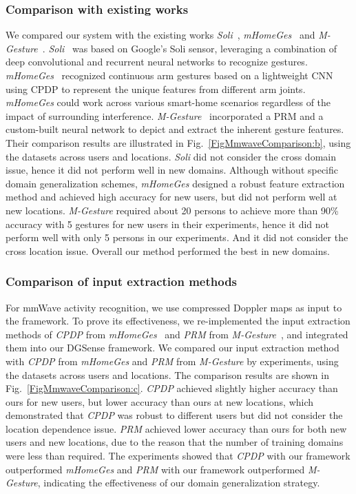 \documentclass[journal]{IEEEtran}
\begin{document}
\subsubsection{Comparison with existing works}
We compared our system with the existing works \textit{Soli}~\cite{Soli:2016}, \textit{mHomeGes}~\cite{LiuH:2020} and \textit{M-Gesture}~\cite{LiuH:2022}. \textit{Soli}~\cite{Soli:2016} was based on Google’s Soli sensor, leveraging a combination of deep convolutional and recurrent neural networks to recognize gestures. \textit{mHomeGes}~\cite{LiuH:2020} recognized continuous arm gestures based on a lightweight CNN using CPDP to represent the unique features from different arm joints. \textit{mHomeGes} could work across various smart-home scenarios regardless of the impact of surrounding interference. \textit{M-Gesture}~\cite{LiuH:2022} incorporated a PRM and a custom-built neural network to depict and extract the inherent gesture features. Their comparison results are illustrated in Fig.~\ref{FigMmwaveComparison:b}, using the datasets across users and locations. \textit{Soli} did not consider the cross domain issue, hence it did not perform well in new domains. Although without specific domain generalization schemes, \textit{mHomeGes} designed a robust feature extraction method and achieved high accuracy for new users, but did not perform well at new locations. \textit{M-Gesture} required about 20 persons to achieve more than 90\% accuracy with 5 gestures for new users in their experiments, hence it did not perform well with only 5 persons in our experiments. And it did not consider the cross location issue. Overall our method performed the best in new domains.

\subsubsection{Comparison of input extraction methods}
For mmWave activity recognition, we use compressed Doppler maps as input to the framework. To prove its effectiveness, we re-implemented the input extraction methods of \textit{CPDP} from \textit{mHomeGes}~\cite{LiuH:2020} and \textit{PRM} from \textit{M-Gesture}~\cite{LiuH:2022}, and integrated them into our DGSense framework. We compared our input extraction method with \textit{CPDP} from \textit{mHomeGes} and \textit{PRM} from \textit{M-Gesture} by experiments, using the datasets across users and locations. The comparison results are shown in Fig.~\ref{FigMmwaveComparison:c}. \textit{CPDP} achieved slightly higher accuracy than ours for new users, but lower accuracy than ours at new locations, which demonstrated that \textit{CPDP} was robust to different users but did not consider the location dependence issue. \textit{PRM} achieved lower accuracy than ours for both new users and new locations, due to the reason that the number of training domains were less than required. The experiments showed that \textit{CPDP} with our framework outperformed \textit{mHomeGes} and \textit{PRM} with our framework outperformed \textit{M-Gesture}, indicating the effectiveness of our domain generalization strategy.
\end{document}
